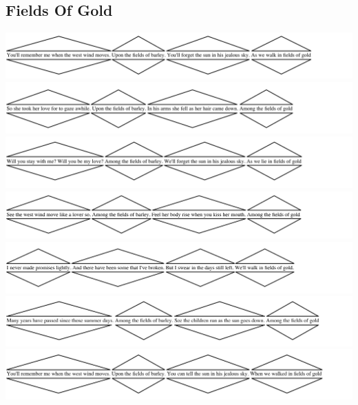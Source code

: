 \newpage
\subsection*{Fields Of Gold}

\includegraphics[width=\textwidth]{resources/trees/fog-s1.png}
\includegraphics[width=\textwidth]{resources/trees/fog-s2.png}
\includegraphics[width=\textwidth]{resources/trees/fog-s3.png}
\includegraphics[width=\textwidth]{resources/trees/fog-s4.png}
\includegraphics[width=\textwidth]{resources/trees/fog-br.png}
\includegraphics[width=\textwidth]{resources/trees/fog-s5.png}
\includegraphics[width=\textwidth]{resources/trees/fog-s6.png}










